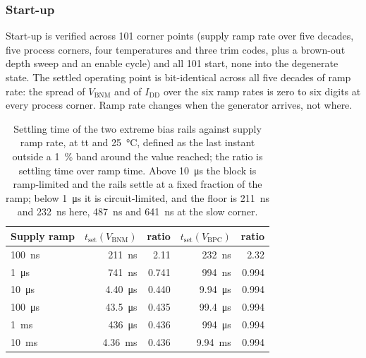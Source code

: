 \subsubsection{Start-up}\label{sss:biasgen-startup}

Start-up is verified across 101 corner points (supply ramp rate over five
decades, five process corners, four temperatures and three trim codes, plus a
brown-out depth sweep and an enable cycle) and all 101 start, none into the
degenerate state. The settled operating point is bit-identical across all five
decades of ramp rate: the spread of \(V_{\mathrm{BNM}}\) and of \(I_{\mathrm{DD}}\) over
the six ramp rates is zero to six digits at every process corner. Ramp rate
changes when the generator arrives, not where.

\begin{table}[htbp]
  \centering
  \caption[{Settling time of the bias rails against supply ramp rate.}]{Settling time of the two extreme bias rails against supply ramp rate, at tt and \SI{25}{\celsius}, defined as the last instant outside a \SI{1}{\percent} band around the value reached; the ratio is settling time over ramp time. Above \SI{10}{\micro\second} the block is ramp-limited and the rails settle at a fixed fraction of the ramp; below \SI{1}{\micro\second} it is circuit-limited, and the floor is \SI{211}{\nano\second} and \SI{232}{\nano\second} here, \SI{487}{\nano\second} and \SI{641}{\nano\second} at the slow corner.}
  \label{tab:biasgen-ramp}
  \begin{tabular}{lrrrr}
    \toprule
    Supply ramp & \(t_{\mathrm{set}}(V_{\mathrm{BNM}})\) & ratio & \(t_{\mathrm{set}}(V_{\mathrm{BPC}})\) & ratio \\
    \midrule
    \SI{100}{\nano\second}  & \SI{211}{\nano\second}  & 2.11  & \SI{232}{\nano\second}  & 2.32 \\
    \SI{1}{\micro\second}   & \SI{741}{\nano\second}  & 0.741 & \SI{994}{\nano\second}  & 0.994 \\
    \SI{10}{\micro\second}  & \SI{4.40}{\micro\second}& 0.440 & \SI{9.94}{\micro\second}& 0.994 \\
    \SI{100}{\micro\second} & \SI{43.5}{\micro\second}& 0.435 & \SI{99.4}{\micro\second}& 0.994 \\
    \SI{1}{\milli\second}   & \SI{436}{\micro\second} & 0.436 & \SI{994}{\micro\second} & 0.994 \\
    \SI{10}{\milli\second}  & \SI{4.36}{\milli\second}& 0.436 & \SI{9.94}{\milli\second}& 0.994 \\
    \bottomrule
  \end{tabular}
\end{table}

